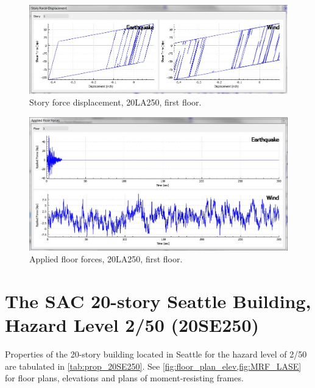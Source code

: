 \documentclass{simcenterdocumentation}
\begin{document}
\begin{figure}[H]
	\centering \includegraphics[scale=0.35]{20LA250_sfd.jpg}
	\caption{Story force displacement, 20LA250, first floor.}
\end{figure}
\begin{figure}[H]
	\centering \includegraphics[scale=0.35]{20LA250_aff.jpg}
	\caption{Applied floor forces, 20LA250, first floor.}
\end{figure}





\section{The SAC 20-story Seattle Building, Hazard Level 2/50 (20SE250)}
Properties of the 20-story building located in Seattle for the hazard level of 2/50 are tabulated in \cref{tab:prop_20SE250}. See \cref{fig:floor_plan_elev,fig:MRF_LASE} for floor plans, elevations and plans of moment-resisting frames.
\end{document}

